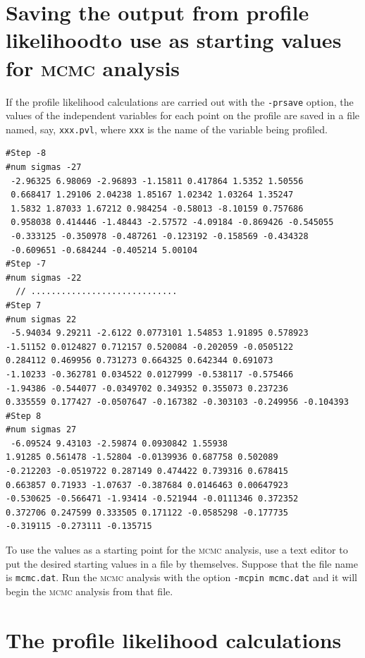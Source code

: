 \documentclass{admbmanual}
\newcommand\apl{profile likelihood}
\begin{document}
\section{Saving the output from \apl\br  to use as starting values
for \textsc{mcmc} analysis}

If the profile likelihood calculations are carried out with the \texttt{-prsave}
option, the values of the independent variables for each point on the profile
are saved in a file named, say, \texttt{xxx.pvl}, where \texttt{xxx} is the name
of the variable being profiled.
\begin{lstlisting}
#Step -8
#num sigmas -27
 -2.96325 6.98069 -2.96893 -1.15811 0.417864 1.5352 1.50556
 0.668417 1.29106 2.04238 1.85167 1.02342 1.03264 1.35247
 1.5832 1.87033 1.67212 0.984254 -0.58013 -8.10159 0.757686
 0.958038 0.414446 -1.48443 -2.57572 -4.09184 -0.869426 -0.545055
 -0.333125 -0.350978 -0.487261 -0.123192 -0.158569 -0.434328
 -0.609651 -0.684244 -0.405214 5.00104
#Step -7
#num sigmas -22
  // .............................
#Step 7
#num sigmas 22
 -5.94034 9.29211 -2.6122 0.0773101 1.54853 1.91895 0.578923
-1.51152 0.0124827 0.712157 0.520084 -0.202059 -0.0505122
0.284112 0.469956 0.731273 0.664325 0.642344 0.691073
-1.10233 -0.362781 0.034522 0.0127999 -0.538117 -0.575466
-1.94386 -0.544077 -0.0349702 0.349352 0.355073 0.237236
0.335559 0.177427 -0.0507647 -0.167382 -0.303103 -0.249956 -0.104393
#Step 8
#num sigmas 27
 -6.09524 9.43103 -2.59874 0.0930842 1.55938
1.91285 0.561478 -1.52804 -0.0139936 0.687758 0.502089
-0.212203 -0.0519722 0.287149 0.474422 0.739316 0.678415
0.663857 0.71933 -1.07637 -0.387684 0.0146463 0.00647923
-0.530625 -0.566471 -1.93414 -0.521944 -0.0111346 0.372352
0.372706 0.247599 0.333505 0.171122 -0.0585298 -0.177735
-0.319115 -0.273111 -0.135715
\end{lstlisting}
To use the values as a starting point for the \textsc{mcmc} analysis, use a text
editor to put the desired starting values in a file by themselves. Suppose that
the file name is \texttt{mcmc.dat}. Run the \textsc{mcmc} analysis with the
option \texttt{-mcpin mcmc.dat} and it will begin the \textsc{mcmc} analysis
from that file.

\section{The profile likelihood calculations}
\end{document}
